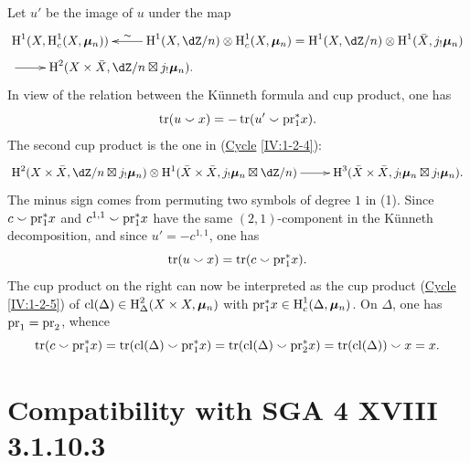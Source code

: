 Let $u'$ be the image of $u$ under the map
\begin{align*}
&\xymatrix{
  \h^1(X,\h_c^1(X,\dmu_n))
    & \ar[l]_-\sim \h^1(X,\dZ/n) \otimes \h_c^1(X,\dmu_n) = \h^1(X,\dZ/n)\otimes \h^1(\bar X,j_!\dmu_n)
} \\
&\xymatrix{
  \ar[r]
    & \h^2(X\times \bar X,\dZ/n\boxtimes j_!\dmu_n) \text{.}
}
\end{align*}
In view of the relation between the K\"unneth formula and cup product, one
has
\[
  \operatorname{tr}(u\smallsmile x) = -\operatorname{tr}(u'\smallsmile \mathrm{pr}_1^\ast x) \text{.}
\]
The second cup product is the one in
(\hyperref[IV]{Cycle} \ref{IV:1-2-4}):
\[\xymatrix{
  \h^2(X\times \bar X,\dZ/n\boxtimes j_!\dmu_n) \otimes \h^1(\bar X\times \bar X,j_!\dmu_n\boxtimes \dZ/n) \ar[r]
    & \h^3(\bar X\times \bar X,j_!\dmu_n \boxtimes j_!\dmu_n) \text{.}
}\]
The minus sign comes from permuting two symbols of degree $1$ in (1). Since
$c\smallsmile\mathrm{pr}_1^\ast x$ and $c^{1,1}\smallsmile \mathrm{pr}_1^\ast x$ have the
same $(2,1)$-component in the K\"unneth decomposition, and since
$u'=-c^{1,1}$, one has
\[
  \operatorname{tr}(u\smallsmile x) = \operatorname{tr}(c\smallsmile \mathrm{pr}_1^\ast x) \text{.}
\]
The cup product on the right can now be interpreted as the cup product
(\hyperref[IV]{Cycle} \ref{IV:1-2-5}) of
$\operatorname{cl}(\Delta)\in \operatorname{H}_\Delta^2(X\times X,{\bm\mu}_n)$ with
$\mathrm{pr}_1^\ast x\in \operatorname{H}_c^1(\Delta,{\bm\mu}_n)$. On $\Delta$, one has
$\mathrm{pr}_1=\mathrm{pr}_2$, whence
\[
  \operatorname{tr}(c\smallsmile \mathrm{pr}_1^\ast x) = \operatorname{tr}(\operatorname{cl}(\Delta)\smallsmile \mathrm{pr}_1^\ast x) = \operatorname{tr}(\operatorname{cl}(\Delta)\smallsmile \mathrm{pr}_2^\ast x) = \operatorname{tr}(\operatorname{cl}(\Delta))\smallsmile x = x \text{.}
\]


\section{Compatibility with SGA 4 XVIII 3.1.10.3}\label{V:4}

